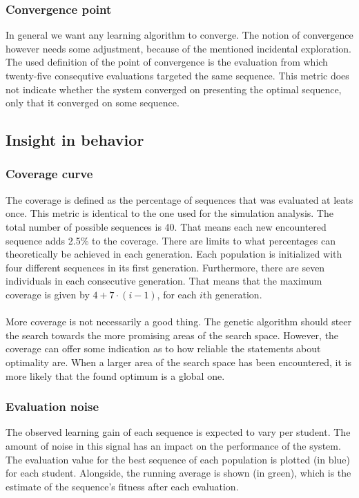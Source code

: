 \subsubsection{Convergence point}
In general we want any learning algorithm to converge. The notion of
convergence however needs some adjustment, because of the mentioned incidental
exploration. The used definition of the point of convergence is the evaluation
from which twenty-five consequtive evaluations targeted the same sequence.
This metric does not indicate whether the system converged on presenting the
optimal sequence, only that it converged on some sequence.
\subsection{Insight in behavior}
\subsubsection{Coverage curve}
The coverage is defined as the percentage of sequences that was evaluated at
leats once. This metric is identical to the one used for the simulation
analysis. The total number of possible sequences is 40. That means each new
encountered sequence adds 2.5\% to the coverage. There are limits to what
percentages can theoretically be achieved in each generation. Each population
is initialized with four different sequences in its first generation.
Furthermore, there are seven individuals in each consecutive generation. That
means that the maximum coverage is given by $4+7\cdot(i-1)$, for each $i$th
generation.\\\\
\noindent
More coverage is not necessarily a good thing. The genetic algorithm should
steer the search towards the more promising areas of the search space. However,
the coverage can offer some indication as to how reliable the statements about
optimality are. When a larger area of the search space has been
encountered, it is more likely that the found optimum is a global one.
\subsubsection{Evaluation noise}
The observed learning gain of each sequence is expected to vary per student. The
amount of noise in this signal has an impact on the performance of the system.
The evaluation value for the best sequence of each population is plotted (in
blue) for each student. Alongside, the running average is shown (in green),
which is the estimate of the sequence's fitness after each evaluation.
